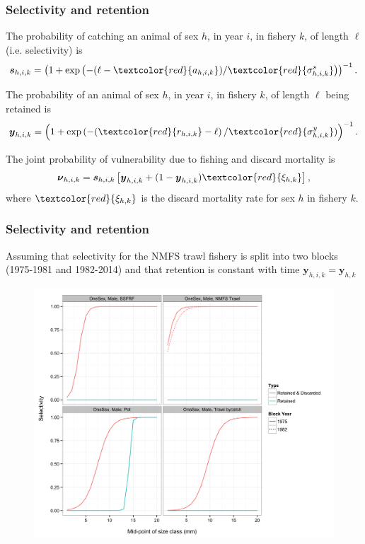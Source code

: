 \documentclass{beamer}
\begin{document}

\begin{frame}
\frametitle{Selectivity and retention}
The probability of catching an animal of sex $h$, in year $i$, in fishery $k$,
of length $\ell$ (i.e. selectivity) is
\begin{equation*}
  \boldsymbol{s}_{h,i,k} = \left(1 + \exp \left(-(\ell - \textcolor{red}{a_{h,i,k}}) /
  \textcolor{red}{\sigma_{h,i,k}^s} \right) \right)^{-1}.
\end{equation*}

The probability of an animal of sex $h$, in year $i$, in fishery $k$, of length
$\ell$ being retained is
\begin{equation*}
  \boldsymbol{y}_{h,i,k} = \left(1 + \exp \left(-(\textcolor{red}{r_{h,i,k}} - \ell \right) /
  \textcolor{red}{\sigma_{h,i,k}^y}) \right)^{-1}.
\end{equation*}

The joint probability of vulnerability due to fishing and discard mortality is
\begin{equation*}
  \boldsymbol\nu_{h,i,k} = \boldsymbol{s}_{h,i,k} \left[ \boldsymbol{y}_{h,i,k} + (1 - \boldsymbol{y}_{h,i,k})
    \textcolor{red}{\xi_{h,k}} \right],
\end{equation*}
where $\textcolor{red}{\xi_{h,k}}$ is the discard mortality rate for sex $h$ in
fishery $k$.
\end{frame}


\begin{frame}
\frametitle{Selectivity and retention}
Assuming that selectivity for the NMFS trawl fishery is split into two blocks
(1975-1981 and 1982-2014) and that retention is constant with time
$\boldsymbol{y}_{h,i,k} = \boldsymbol{y}_{h,k}$
\begin{figure}[!htbp]
  \centering
  \includegraphics[width=0.6\linewidth]{../../examples/bbrkc/OneSex/figure/selectivity.png}
\end{figure}
\end{frame}
\end{document}
